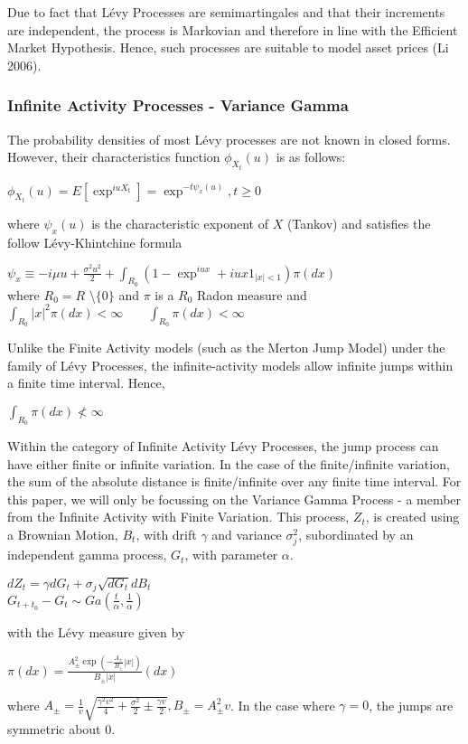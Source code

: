 \documentclass[11pt]{article}
\theoremstyle{definition}
\begin{document}
\justify Due to fact that L\'{e}vy Processes are semimartingales and that their increments are independent, the process is Markovian and therefore in line with the Efficient Market Hypothesis. Hence, such processes are suitable to model asset prices (Li 2006). 
\subsubsection{Infinite Activity Processes - Variance Gamma}
The probability densities of most L\'{e}vy processes are not known in closed forms. However, their characteristics function $\phi_{X_{t}}(u)$ is as follows:
\begin{center}
$
\phi_{X_{t}}(u) = E[\exp^{iuX_{t}}] = \exp^{-t\psi_{x}(u)},t\ge 0
$
\end{center}


\justify where $\psi_{x}(u)$ is the characteristic exponent of $X$ (Tankov) and satisfies the follow L\'{e}vy-Khintchine formula
\begin{center}
$\psi_{x}\equiv -i\mu u + \frac{\sigma^{2}u^{2}}{2} + \int_{R_{0}} (1-\exp^{iux}+iux1_{|x|<1})\pi (dx) $\\
where $R_{0} = R$ \textbackslash $\{0\}$ and $\pi$ is a $R_{0}$ Radon measure and \\
$\int_{R_{0}} |x|^{2} \pi (dx)< \infty \qquad \int_{R_{0}} \pi (dx) < \infty$
\end{center}

Unlike the Finite Activity models (such as the Merton Jump Model) under the family of L\'{e}vy Processes, the infinite-activity models allow infinite jumps within a finite time interval. Hence,
\begin{center}
$\int_{R_{0}} \pi (dx) \not< \infty$
\end{center}

Within the category of Infinite Activity L\'{e}vy Processes, the jump process can have either finite or infinite variation. In the case of the finite/infinite variation, the sum of the absolute distance is finite/infinite over any finite time interval. For this paper, we will only be focussing on the Variance Gamma Process - a member from the Infinite Activity with Finite Variation. This process, $Z_{t}$, is created using a Brownian Motion, $B_{t}$, with drift $\gamma$ and variance $\sigma_{j}^2$, subordinated by an independent gamma process, $G_{t}$, with parameter $\alpha$.
\begin{center}
$dZ_{t} = \gamma dG_{t} + \sigma_{j}\sqrt{dG_{t}}dB_{t}$\\
$G_{t+t_{0}} - G_{t} \sim Ga(\frac{t}{\alpha},\frac{1}{\alpha})$
\end{center}
with the L\'{e}vy measure given by
\begin{center}
$\pi(dx) = \frac{A^{2}_{\pm}\exp(-\frac{A_{\pm}}{B_{\pm}}|x|)}{B_{\pm}|x|}(dx)$
\end{center}
where $A_{\pm}=\frac{1}{v}\sqrt{\frac{\gamma^{2}v^{2}}{4}+\frac{\sigma^{2}}{2} \pm \frac{\gamma v}{2}},B_{\pm}=A^{2}_{\pm}v$. In the case where $\gamma=0$, the jumps are symmetric about 0.
\end{document}
